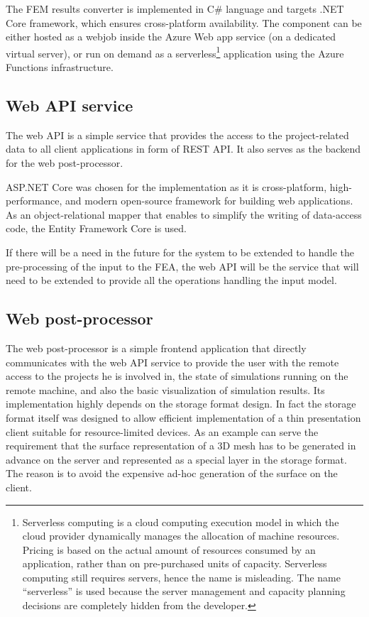 The FEM results converter is implemented in C\# language and targets .NET Core framework, which ensures cross-platform availability. The component can be either hosted as a webjob inside the Azure Web app service (on a dedicated virtual server), or run on demand as a serverless\footnote{Serverless computing is a cloud computing execution model in which the cloud provider dynamically manages the allocation of machine resources. Pricing is based on the actual amount of resources consumed by an application, rather than on pre-purchased units of capacity. Serverless computing still requires servers, hence the name is misleading. The name ``serverless'' is used because the server management and capacity planning decisions are completely hidden from the developer.} application using the Azure Functions infrastructure.

\subsection*{Web API service}

The web API is a simple service that provides the access to the project-related data to all client applications in form of REST API. It also serves as the backend for the web post-processor.

ASP.NET Core \cite{AspNetCore} was chosen for the implementation as it is cross-platform, high-performance, and modern open-source framework for building web applications. As an object-relational mapper that enables to simplify the writing of data-access code, the Entity Framework Core \cite{EFCore} is used.

If there will be a need in the future for the system to be extended to handle the pre-processing of the input to the FEA, the web API will be the service that will need to be extended to provide all the operations handling the input model.

\subsection*{Web post-processor}

The web post-processor is a simple frontend application that directly communicates with the web API service to provide the user with the remote access to the projects he is involved in, the state of simulations running on the remote machine, and also the basic visualization of simulation results. Its implementation highly depends on the storage format design. In fact the storage format itself was designed to allow efficient implementation of a thin presentation client suitable for resource-limited devices. As an example can serve the requirement that the surface representation of a 3D mesh has to be generated in advance on the server and represented as a special layer in the storage format. The reason is to avoid the expensive ad-hoc generation of the surface on the client.

